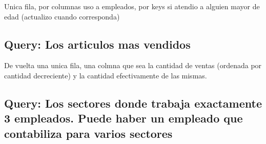 Unica fila, por columnas uso a empleados, por keys si atendio a alguien mayor de edad (actualizo cuando corresponda)

\subsection{Query: Los articulos mas vendidos}

De vuelta una unica fila, una colmna que sea la cantidad de ventas (ordenada por cantidad decreciente) y la cantidad efectivamente de las mismas.

\subsection{Query: Los sectores donde trabaja exactamente 3 empleados. Puede haber un empleado que contabiliza para varios sectores}

